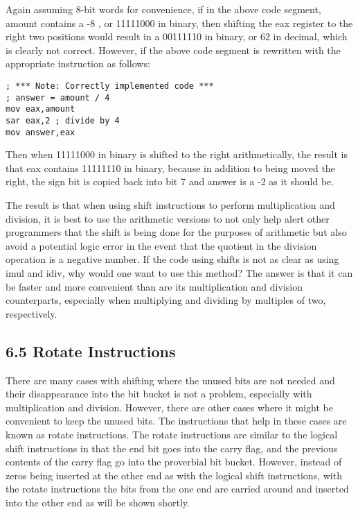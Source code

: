 \documentclass[10pt]{article}
\begin{document}
Again assuming 8-bit words for convenience, if in the above code segment, amount contains a -8 , or 11111000 in binary, then shifting the eax register to the right two positions would result in a 00111110 in binary, or 62 in decimal, which is clearly not correct. However, if the above code segment is rewritten with the appropriate instruction as follows:

\begin{verbatim}
; *** Note: Correctly implemented code ***
; answer = amount / 4
mov eax,amount
sar eax,2 ; divide by 4
mov answer,eax
\end{verbatim}

Then when 11111000 in binary is shifted to the right arithmetically, the result is that eax contains 11111110 in binary, because in addition to being moved the right, the sign bit is copied back into bit 7 and answer is a -2 as it should be.

The result is that when using shift instructions to perform multiplication and division, it is best to use the arithmetic versions to not only help alert other programmers that the shift is being done for the purposes of arithmetic but also avoid a potential logic error in the event that the quotient in the division operation is a negative number. If the code using shifts is not as clear as using imul and idiv, why would one want to use this method? The answer is that it can be faster and more convenient than are its multiplication and division counterparts, especially when multiplying and dividing by multiples of two, respectively.

\subsection*{6.5 Rotate Instructions}
There are many cases with shifting where the unused bits are not needed and their disappearance into the bit bucket is not a problem, especially with multiplication and division. However, there are other cases where it might be convenient to keep the unused bits. The instructions that help in these cases are known as rotate instructions. The rotate instructions are similar to the logical shift instructions in that the end bit goes into the carry flag, and the previous contents of the carry flag go into the proverbial bit bucket. However, instead of zeros being inserted at the other end as with the logical shift instructions, with the rotate instructions the bits from the one end are carried around and inserted into the other end as will be shown shortly.
\end{document}
